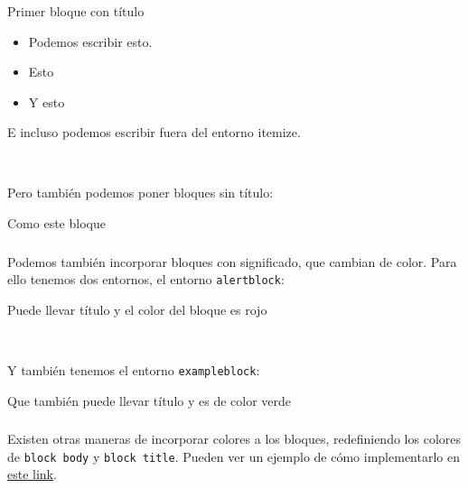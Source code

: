 \documentclass[11pt]{beamer}	%
\begin{document}
\begin{frame}
	\frametitle{\secname}
	
	\begin{block}{Primer bloque con título}	%
	
	\begin{itemize}
		\item Podemos escribir esto.
		\item Esto
		\item Y esto 
	\end{itemize}
	
	E incluso podemos escribir \alert{fuera del entorno itemize}.	%
	\end{block} \vfill %
	
	Pero también podemos poner bloques sin título:
	
	\begin{block}{}
		Como este bloque
	\end{block}
\end{frame}

\begin{frame}
	\frametitle{\secname}
	
	Podemos también incorporar bloques con significado, que cambian de color. Para ello tenemos dos entornos, el entorno \texttt{alertblock}:
		\begin{alertblock}{Puede llevar título}
			y el color del bloque es rojo
		\end{alertblock} \vfill
	
	Y también tenemos el entorno \texttt{exampleblock}:
		\begin{exampleblock}{Que también puede llevar título}
			y es de color verde
		\end{exampleblock}
\end{frame}

\begin{frame}
	\frametitle{\secname}
	
	Existen otras maneras de incorporar colores a los bloques, redefiniendo los colores de \texttt{block body} y \texttt{block title}. Pueden ver un ejemplo de cómo implementarlo en \href{https://tex.stackexchange.com/questions/33231/how-to-change-the-color-of-a-block-within-a-custom-beamer-sty-theme-file}{este link}.
\end{frame}
\end{document}
